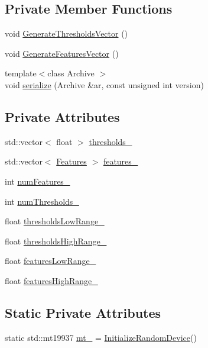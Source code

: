\subsection*{Private Member Functions}
\begin{DoxyCompactItemize}
\item 
void \hyperlink{classrdf_1_1bpc_1_1FeaturesMat_a58963a1543309ade81bb5aeaf2508e14}{Generate\+Thresholds\+Vector} ()
\item 
void \hyperlink{classrdf_1_1bpc_1_1FeaturesMat_a53eb814797bbd35eedc0d98cedcb4952}{Generate\+Features\+Vector} ()
\item 
{\footnotesize template$<$class Archive $>$ }\\void \hyperlink{classrdf_1_1bpc_1_1FeaturesMat_ad1dcd821565ad3a3dea0dd5953e6f678}{serialize} (Archive \&ar, const unsigned int version)
\end{DoxyCompactItemize}
\subsection*{Private Attributes}
\begin{DoxyCompactItemize}
\item 
std\+::vector$<$ float $>$ \hyperlink{classrdf_1_1bpc_1_1FeaturesMat_af78d3fa0ca76bc3ec1102772fcbac819}{thresholds\+\_\+}
\item 
std\+::vector$<$ \hyperlink{classrdf_1_1bpc_1_1Features}{Features} $>$ \hyperlink{classrdf_1_1bpc_1_1FeaturesMat_a476cd5bf74e3808ea56e585db0083ceb}{features\+\_\+}
\item 
int \hyperlink{classrdf_1_1bpc_1_1FeaturesMat_acc84dd8b048451bbe7be60dce7c3417c}{num\+Features\+\_\+}
\item 
int \hyperlink{classrdf_1_1bpc_1_1FeaturesMat_aeb9a1a867455c3bb26292ff63fe6aada}{num\+Thresholds\+\_\+}
\item 
float \hyperlink{classrdf_1_1bpc_1_1FeaturesMat_a9b44bbd98c5850168c4c33054d6e5ed2}{thresholds\+Low\+Range\+\_\+}
\item 
float \hyperlink{classrdf_1_1bpc_1_1FeaturesMat_a0458cdc2eafc76455938ab3d54fcb762}{thresholds\+High\+Range\+\_\+}
\item 
float \hyperlink{classrdf_1_1bpc_1_1FeaturesMat_a77e4d847ce04f626964fe361d7bee1a5}{features\+Low\+Range\+\_\+}
\item 
float \hyperlink{classrdf_1_1bpc_1_1FeaturesMat_a3c6a55c571fac002562a59b67f681719}{features\+High\+Range\+\_\+}
\end{DoxyCompactItemize}
\subsection*{Static Private Attributes}
\begin{DoxyCompactItemize}
\item 
static std\+::mt19937 \hyperlink{classrdf_1_1bpc_1_1FeaturesMat_ae4222f4a5e1a75b6bacd6f03108a2095}{mt\+\_\+} = \hyperlink{FeaturesMat_8cpp_a0c2f708dd4e06898c274c468e8f281c2}{Initialize\+Random\+Device}()
\end{DoxyCompactItemize}
